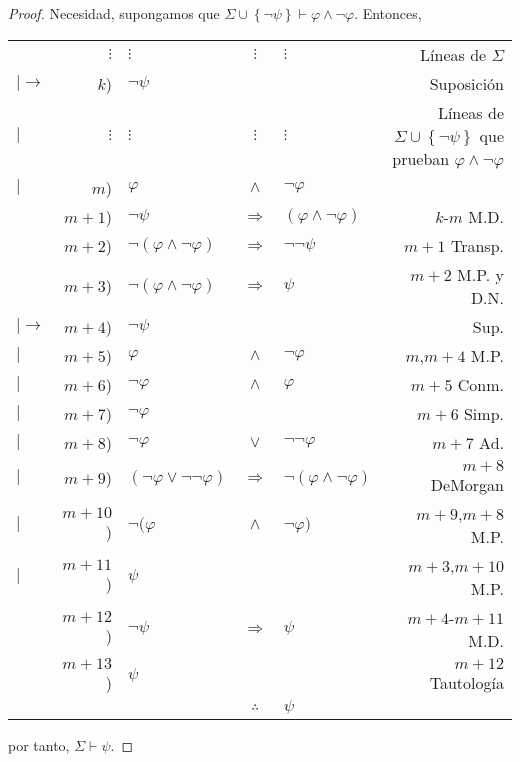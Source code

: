 \documentclass[12pt]{report}
\theoremstyle{largebreak}
\begin{document}
    \begin{proof}
        Necesidad, supongamos que $\Sigma\cup\left\{\neg\psi \right\}\vdash\varphi\land\neg\varphi$. Entonces,
        \begin{center}
            \begin{tabular}{l r l c l r}
                & $\vdots$ & $\vdots$ & $\vdots$ & $\vdots$ & Líneas de $\Sigma$ \\
                $|\longrightarrow$ & $k$) & $\neg\psi$ &  &  & Suposición \\
                $|$ & $\vdots$ & $\vdots$ & $\vdots$ & $\vdots$ & Líneas de $\Sigma\cup\left\{\neg\psi\right\}$ que prueban $\varphi\land\neg\varphi$ \\
                $|$ & $m$) & $\varphi$ & $\land$ & $\neg\varphi$ &  \\
                \hline
                 & $m+1$) & $\neg\psi$ & $\Rightarrow$ & $(\varphi\land\neg\varphi)$ & $k$-$m$ M.D. \\
                 & $m+2$) & $\neg(\varphi\land\neg\varphi)$ & $\Rightarrow$ & $\neg\neg\psi$ & $m+1$ Transp. \\
                 & $m+3$) & $\neg(\varphi\land\neg\varphi)$ & $\Rightarrow$ & $\psi$ & $m+2$ M.P. y D.N. \\
                $|\longrightarrow$ & $m+4$) & $\neg\psi$ &  &  & Sup. \\
                $|$ & $m+5$) & $\varphi$ & $\land$ & $\neg\varphi$ & $m$,$m+4$ M.P. \\
                $|$ & $m+6$) & $\neg\varphi$ & $\land$ & $\varphi$ & $m+5$ Conm. \\
                $|$ & $m+7$) & $\neg\varphi$ &  &  & $m+6$ Simp. \\
                $|$ & $m+8$) & $\neg\varphi$ & $\lor$ & $\neg\neg\varphi$ & $m+7$ Ad. \\
                $|$ & $m+9$) & $(\neg\varphi\lor\neg\neg\varphi)$ & $\Rightarrow$ & $\neg(\varphi\land\neg\varphi)$ & $m+8$ DeMorgan \\
                $|$ & $m+10$) & $\neg(\varphi$ & $\land$ & $\neg\varphi)$ & $m+9$,$m+8$ M.P. \\
                $|$ & $m+11$) & $\psi$ &  &  & $m+3$,$m+10$ M.P. \\
                \hline
                 & $m+12$) & $\neg\psi$ & $\Rightarrow$ & $\psi$ & $m+4$-$m+11$ M.D. \\
                 & $m+13$) & $\psi$ &  &  & $m+12$ Tautología \\
                \hline
                & & & $\therefore$ & $\psi$ & \\
            \end{tabular}
        \end{center}
        por tanto, $\Sigma\vdash\psi$.


\end{proof}
\end{document}
